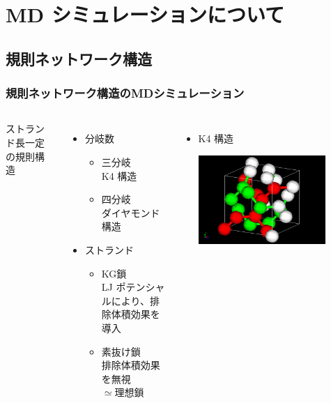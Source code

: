 \documentclass[12pt, dvipdfmx]{beamer}
\begin{document}
\section{MD シミュレーションについて}
\subsection{規則ネットワーク構造}
\begin{frame}
	\frametitle{規則ネットワーク構造のMDシミュレーション}
	\begin{columns}[totalwidth=1\textwidth]
			ストランド長一定の規則構造
			\begin{itemize}
				\item 分岐数 
					\begin{itemize}
						\item 三分岐\\K4 構造
						\item 四分岐\\ダイヤモンド構造
					\end{itemize}
				\item ストランド
					\begin{itemize}
						\item KG鎖\\LJ ポテンシャルにより、\alert{排除体積効果}を導入
						\item 素抜け鎖\\{\color{blue}排除体積効果を無視}\\$\simeq$\alert{理想鎖}
					\end{itemize}
			\end{itemize}
			\begin{itemize}
				\item K4 構造

				\includegraphics[width=0.8\textwidth]{K4_d.png}


\end{itemize}
\end{columns}
\end{frame}
\end{document}
